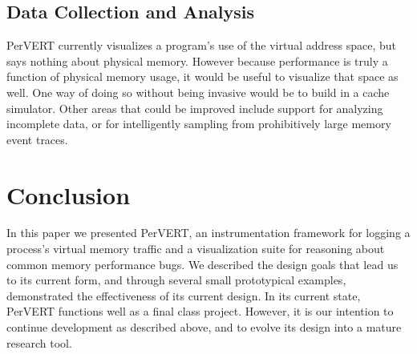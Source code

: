 \documentclass[annual]{acmsiggraph}
\begin{document}
  \subsection{Data Collection and Analysis}

  PerVERT currently visualizes a program's use of the virtual address space, but says nothing about physical memory.
  However because performance is truly a function of physical memory usage, it would be useful to visualize that space as well.
  One way of doing so without being invasive would be to build in a cache simulator.
  Other areas that could be improved include support for analyzing incomplete data, 
    or for intelligently sampling from prohibitively large memory event traces.

\section{Conclusion}

In this paper we presented PerVERT, an instrumentation framework for logging a process's virtual memory traffic and 
  a visualization suite for reasoning about common memory performance bugs.
We described the design goals that lead us to its current form,
  and through several small prototypical examples, demonstrated the effectiveness of its current design.
In its current state, PerVERT functions well as a final class project.
However, it is our intention to continue development as described above, and to evolve its design into a mature research tool.



\end{document}
